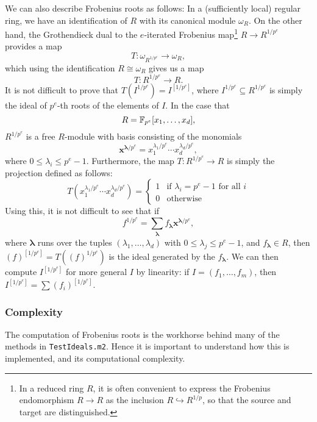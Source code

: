 \documentclass{amsart}
\renewcommand{\leq}{\leqslant}
\begin{document}
We can also describe Frobenius roots as follows:  In a (sufficiently local) regular ring, we have an identification of $R$ with its canonical module $\omega_R$.
On the other hand, the Grothendieck dual to the $e$-iterated Frobenius map\footnote{In a reduced ring $R$, it is often convenient to express the Frobenius endomorphism $R \to R$ as the inclusion $R \hookrightarrow R^{1/p}$, so that the source and target  are distinguished.} $R \to R^{1/p^e}$ provides a map
\begin{equation}
\label{eq.DualToFrobenius}
T : \omega_{R^{1/p^e}} \to \omega_R,
\end{equation}
which using the identification $R \cong \omega_R$ gives us a map
\[
T : R^{1/p^e} \to R.
\]
It is not difficult to prove that
$T(I^{1/p^e})=I^{[1/p^e]}$,
where $I^{1/p^e} \subseteq R^{1/p^e}$ is simply the ideal of $p^e$-th roots of the elements of $I$.
In the case that
\[
R = \mathbb{F}_{p^e}[x_1, \ldots, x_d],
\]
$R^{1/p^e}$ is a free $R$-module with basis consisting of the monomials
\[
\mathbf{x}^{\boldsymbol{\lambda}/p^e}= x_1^{\lambda_1/p^e} \cdots x_d^{\lambda_d/p^e},
\]
where $0 \leq \lambda_i \leq p^e-1$.
Furthermore, the map $T : R^{1/p^e} \to R$ is simply the projection defined as follows:
\[
T(x_1^{\lambda_1/p^e} \cdots x_d^{\lambda_d/p^e}) = \left\{ \begin{array}{rl} 1 &\text{if } \lambda_i = p^{e}-1 \text{ for all }i \\ 0 & \text{otherwise}  \end{array} \right.
\]
Using this, it is not difficult to see that if
\begin{equation}
\label{eqn1}
f^{1/p^e} = \sum_{\boldsymbol{\lambda}} f_{\boldsymbol{\lambda}} \mathbf{x}^{\boldsymbol{\lambda} / p^e},
\end{equation}
where $\boldsymbol{\lambda}$ runs over the tuples $(\lambda_1, \dots, \lambda_d)$ with $0 \leq \lambda_j \leq p^e-1$, and $f_{\boldsymbol{\lambda}} \in R$, then
$(f)^{[1/p^e]} = T( (f)^{1/p^e})$ is the ideal generated by the $f_{\boldsymbol{\lambda}}$.
We can then compute $I^{[1/p^e]}$ for more general $I$ by linearity: if $I=(f_1,\ldots,f_m)$, then $I^{[1/p^e]}= \sum(f_i)^{[1/p^e]}$.

\subsubsection{Complexity}
The computation of Frobenius roots is the workhorse behind many of the methods in \texttt{TestIdeals.m2}.
Hence it is important to understand how this is implemented, and its computational complexity.
\end{document}
